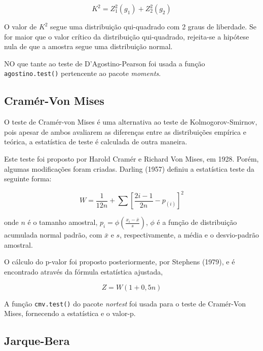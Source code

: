 \documentclass[a4paper,11pt]{article} %
\begin{document}
\begin{equation}
    K^{2} = Z_{1}^{2}(g_{1}) + Z_{2}^{2}(g_{2})
\end{equation}

O valor de $K^{2}$ segue uma distribuição qui-quadrado com 2 graus de liberdade. Se for maior que o valor crítico da distribuição qui-quadrado, rejeita-se a hipótese nula de que a amostra segue uma distribuição normal.\vskip0.3cm

NO que tante ao teste de D’Agostino-Pearson foi usada a função \texttt{agostino.test()} pertencente ao pacote \textit{moments}.\vskip0.3cm




\subsection{Cramér-Von Mises}

O teste de Cramér-von Mises é uma alternativa ao teste de Kolmogorov-Smirnov, pois
apesar de ambos avaliarem as diferenças entre as distribuições empírica e teórica, a estatística de teste é calculada de outra maneira.\vskip0.3cm

Este teste foi proposto por Harold Cramér e Richard Von Mises, em 1928. Porém, algumas modificações foram criadas. Darling (1957) definiu a estatística teste da seguinte forma:

\begin{equation}
    W = \frac{1}{12n} + \sum \left[  \frac{2i-1}{2n} - p_{(i)}\right]^{2}
\end{equation}

onde $n$ é o tamanho amostral, $p_{i} = \phi \left(  \frac{x_{i}-\bar{x}}{s} \right)$, $\phi$ é a função de distribuição acumulada normal padrão, com $\bar{x}$ e $s$, respectivamente, a média e o desvio-padrão amostral.\vskip0.3cm

O cálculo do p-valor foi proposto posteriormente, por Stephens (1979), e é encontrado através da fórmula estatística ajustada,

\begin{equation}
    Z = W(1 + 0,5n)
\end{equation}

A função \texttt{cmv.test()} do pacote \textit{nortest} foi usada para o teste de Cramér-Von Mises, fornecendo a estatística e o valor-p.\vskip0.3cm

\subsection{Jarque-Bera}
\end{document}
